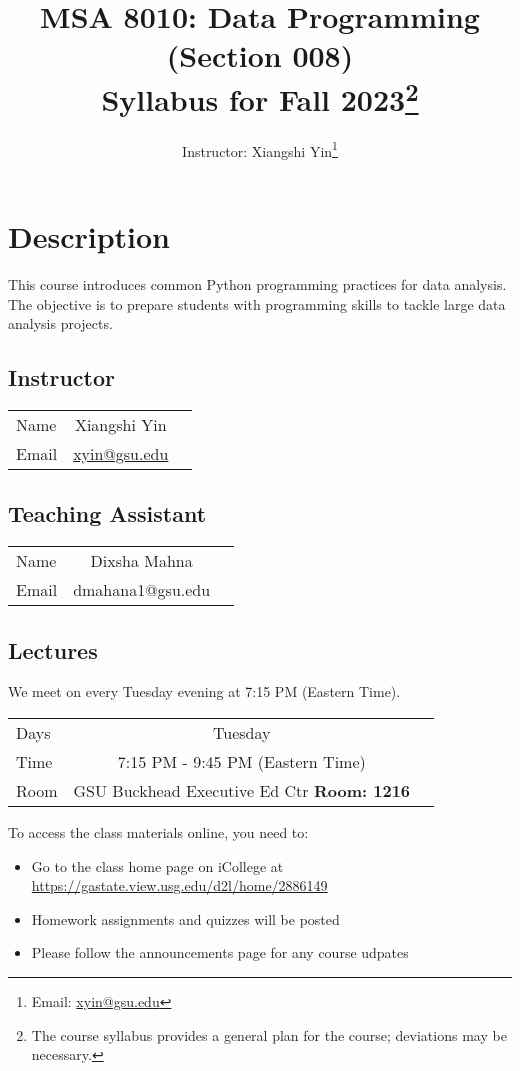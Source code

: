 \documentclass{article}
\title{
	MSA 8010: Data Programming (Section 008)\\
	\large Syllabus for Fall 2023\footnote{The course syllabus provides a general plan for the course; deviations may be necessary.}
}
\author{Instructor: Xiangshi Yin\thanks{Email: \href{mailto:xyin@gsu.edu}{xyin@gsu.edu}}}
\begin{document}
\maketitle

\tableofcontents


\section{Description}
This course introduces common Python programming practices for data analysis. The objective is to prepare students with programming skills to tackle large data analysis projects.


\subsection{Instructor}
\begin{center}
  \begin{tabular}{ l | c r }
    \hline			
    Name & Xiangshi Yin\\
    Email & \href{mailto:xyin@gsu.edu}{xyin@gsu.edu}\\
    \hline  
  \end{tabular}
\end{center}

\subsection{Teaching Assistant}
\begin{center}
	\begin{tabular}{ l | c r }
		\hline			
		Name & Dixsha Mahna\\
		Email & dmahana1@gsu.edu\\
		\hline  
	\end{tabular}
\end{center}

\subsection{Lectures}
We meet on every Tuesday evening at 7:15 PM (Eastern Time).
\begin{center}
  \begin{tabular}{ l | c r }
    \hline			
    Days & Tuesday\\
   Time & 7:15 PM - 9:45 PM (Eastern Time) \\
    Room & GSU Buckhead Executive Ed Ctr \textbf{Room: 1216}\\
    \hline  
  \end{tabular}
\end{center}
\begin{flushleft}
To access the class materials online, you need to:
\begin{itemize}
  \item Go to the class home page on iCollege at \url{https://gastate.view.usg.edu/d2l/home/2886149}
  \item Homework assignments and quizzes will be posted
  \item Please follow the announcements page for any course udpates
\end{itemize}
\end{flushleft}
\end{document}
